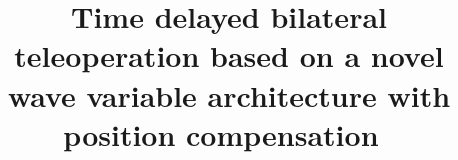 

% 

% 
\documentclass[conference]{IEEEtran}
\IEEEoverridecommandlockouts
\usepackage{cite}
\usepackage{amsmath,amssymb,amsfonts}
\usepackage{algorithmic}
\usepackage{graphicx}
\usepackage{textcomp}
\usepackage{xcolor}
\usepackage{float}
\usepackage{subfigure}

\def\BibTeX{{\rm B\kern-.05em{\sc i\kern-.025em b}\kern-.08em
    T\kern-.1667em\lower.7ex\hbox{E}\kern-.125emX}}


\title{Time delayed bilateral teleoperation based on a novel wave variable architecture with position compensation\
}

